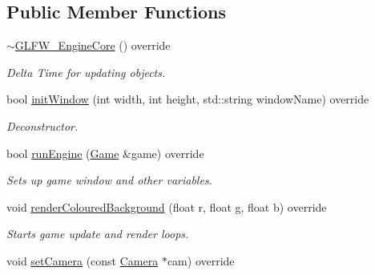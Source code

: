 \subsection*{Public Member Functions}
\begin{DoxyCompactItemize}
\item 
\hypertarget{class_g_l_f_w___engine_core_adf17916892982f1103140b22dc1b37be}{\hyperlink{class_g_l_f_w___engine_core_adf17916892982f1103140b22dc1b37be}{$\sim$\+G\+L\+F\+W\+\_\+\+Engine\+Core} () override}\label{class_g_l_f_w___engine_core_adf17916892982f1103140b22dc1b37be}

\begin{DoxyCompactList}\small\item\em Delta Time for updating objects. \end{DoxyCompactList}\item 
\hypertarget{class_g_l_f_w___engine_core_aa786131ec64e7ee6779c3ac1ee8507ce}{bool \hyperlink{class_g_l_f_w___engine_core_aa786131ec64e7ee6779c3ac1ee8507ce}{init\+Window} (int width, int height, std\+::string window\+Name) override}\label{class_g_l_f_w___engine_core_aa786131ec64e7ee6779c3ac1ee8507ce}

\begin{DoxyCompactList}\small\item\em Deconstructor. \end{DoxyCompactList}\item 
\hypertarget{class_g_l_f_w___engine_core_adf9266f1a9b5d97992691224f0f20c7b}{bool \hyperlink{class_g_l_f_w___engine_core_adf9266f1a9b5d97992691224f0f20c7b}{run\+Engine} (\hyperlink{class_game}{Game} \&game) override}\label{class_g_l_f_w___engine_core_adf9266f1a9b5d97992691224f0f20c7b}

\begin{DoxyCompactList}\small\item\em Sets up game window and other variables. \end{DoxyCompactList}\item 
\hypertarget{class_g_l_f_w___engine_core_a6031a54b0978d6e0fd1be3f292c2059f}{void \hyperlink{class_g_l_f_w___engine_core_a6031a54b0978d6e0fd1be3f292c2059f}{render\+Coloured\+Background} (float r, float g, float b) override}\label{class_g_l_f_w___engine_core_a6031a54b0978d6e0fd1be3f292c2059f}

\begin{DoxyCompactList}\small\item\em Starts game update and render loops. \end{DoxyCompactList}\item 
\hypertarget{class_g_l_f_w___engine_core_a2aba4fb8a635f96fc4057ba841670a29}{void \hyperlink{class_g_l_f_w___engine_core_a2aba4fb8a635f96fc4057ba841670a29}{set\+Camera} (const \hyperlink{class_camera}{Camera} $\ast$cam) override}\label{class_g_l_f_w___engine_core_a2aba4fb8a635f96fc4057ba841670a29}


\end{DoxyCompactItemize}
